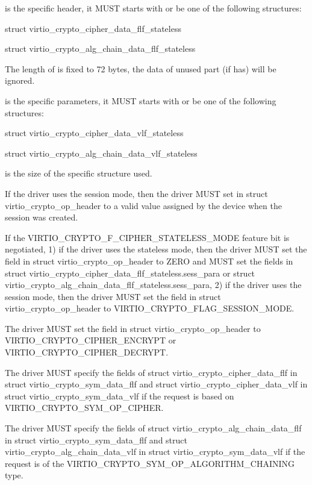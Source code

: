  is the  specific header, it MUST starts
with or be one of the following structures:
\begin{itemize*}
\item struct virtio_crypto_cipher_data_flf_stateless
\item struct virtio_crypto_alg_chain_data_flf_stateless
\end{itemize*}

The length of  is fixed to 72 bytes, the data of unused
part (if has) will be ignored.

 is the  specific parameters, it MUST starts
with or be one of the following structures:
\begin{itemize*}
\item struct virtio_crypto_cipher_data_vlf_stateless
\item struct virtio_crypto_alg_chain_data_vlf_stateless
\end{itemize*}

 is the size of the specific structure used.


\begin{itemize*}
\item If the driver uses the session mode, then the driver MUST set 
    in struct virtio_crypto_op_header to a valid value assigned by the device when the
    session was created.
\item If the VIRTIO_CRYPTO_F_CIPHER_STATELESS_MODE feature bit is negotiated, 1) if the
    driver uses the stateless mode, then the driver MUST set the  field in
    struct virtio_crypto_op_header to ZERO and MUST set the fields in struct
    virtio_crypto_cipher_data_flf_stateless.sess_para or struct
    virtio_crypto_alg_chain_data_flf_stateless.sess_para, 2) if the driver uses the
    session mode, then the driver MUST set the  field in struct
    virtio_crypto_op_header to VIRTIO_CRYPTO_FLAG_SESSION_MODE.
\item The driver MUST set the  field in struct virtio_crypto_op_header
    to VIRTIO_CRYPTO_CIPHER_ENCRYPT or VIRTIO_CRYPTO_CIPHER_DECRYPT.
\item The driver MUST specify the fields of struct virtio_crypto_cipher_data_flf in
    struct virtio_crypto_sym_data_flf and struct virtio_crypto_cipher_data_vlf in
    struct virtio_crypto_sym_data_vlf if the request is based on VIRTIO_CRYPTO_SYM_OP_CIPHER.
\item The driver MUST specify the fields of struct virtio_crypto_alg_chain_data_flf
    in struct virtio_crypto_sym_data_flf and struct virtio_crypto_alg_chain_data_vlf
    in struct virtio_crypto_sym_data_vlf if the request is of the VIRTIO_CRYPTO_SYM_OP_ALGORITHM_CHAINING
    type.
\end{itemize*}

